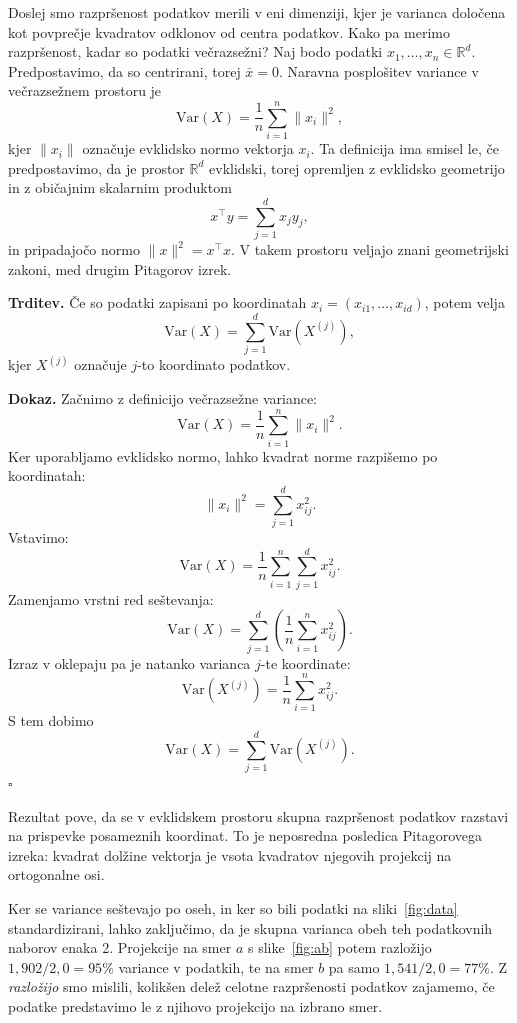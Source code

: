 Doslej smo razpršenost podatkov merili v eni dimenziji, kjer je varianca določena kot povprečje kvadratov odklonov od centra podatkov. Kako pa merimo razpršenost, kadar so podatki večrazsežni? Naj bodo podatki $x_1, \dots, x_n \in \mathbb{R}^d$. Predpostavimo, da so centrirani, torej $\bar{x} = 0$. Naravna posplošitev variance v večrazsežnem prostoru je
\[
\mathrm{Var}(X) = \frac{1}{n} \sum_{i=1}^n \|x_i\|^2,
\]
kjer $\|x_i\|$ označuje evklidsko normo vektorja $x_i$. Ta definicija ima smisel le, če predpostavimo, da je prostor $\mathbb{R}^d$ evklidski, torej opremljen z evklidsko geometrijo in z običajnim skalarnim produktom
\[
x^\top y = \sum_{j=1}^d x_j y_j,
\]
in pripadajočo normo $\|x\|^2 = x^\top x$. V takem prostoru veljajo znani geometrijski zakoni, med drugim Pitagorov izrek.

\medskip

\textbf{Trditev.} Če so podatki zapisani po koordinatah $x_i = (x_{i1}, \dots, x_{id})$, potem velja
\[
\mathrm{Var}(X) = \sum_{j=1}^d \mathrm{Var}(X^{(j)}),
\]
kjer $X^{(j)}$ označuje $j$-to koordinato podatkov.

\medskip

\textbf{Dokaz.} Začnimo z definicijo večrazsežne variance:
\[
\mathrm{Var}(X) = \frac{1}{n} \sum_{i=1}^n \|x_i\|^2.
\]
Ker uporabljamo evklidsko normo, lahko kvadrat norme razpišemo po koordinatah:
\[
\|x_i\|^2 = \sum_{j=1}^d x_{ij}^2.
\]
Vstavimo:
\[
\mathrm{Var}(X) = \frac{1}{n} \sum_{i=1}^n \sum_{j=1}^d x_{ij}^2.
\]
Zamenjamo vrstni red seštevanja:
\[
\mathrm{Var}(X) = \sum_{j=1}^d \left( \frac{1}{n} \sum_{i=1}^n x_{ij}^2 \right).
\]
Izraz v oklepaju pa je natanko varianca $j$-te koordinate:
\[
\mathrm{Var}(X^{(j)}) = \frac{1}{n} \sum_{i=1}^n x_{ij}^2.
\]
S tem dobimo
\[
\mathrm{Var}(X) = \sum_{j=1}^d \mathrm{Var}(X^{(j)}).
\]
\hfill $\square$

\medskip

Rezultat pove, da se v evklidskem prostoru skupna razpršenost podatkov razstavi na prispevke posameznih koordinat. To je neposredna posledica Pitagorovega izreka: kvadrat dolžine vektorja je vsota kvadratov njegovih projekcij na ortogonalne osi.

Ker se variance
%
%
seštevajo po oseh, in ker so bili podatki na sliki~\ref{fig:data} standardizirani, lahko zaključimo, da je skupna varianca obeh teh podatkovnih naborov enaka 2. Projekcije na smer $a$ s slike~\ref{fig:ab} potem razložijo $1,902/2,0=95\%$ variance v podatkih, te na smer $b$ pa samo $1,541/2,0=77\%$. Z {\em razložijo} smo mislili, kolikšen delež celotne razpršenosti podatkov zajamemo, če podatke predstavimo le z njihovo projekcijo na izbrano smer. 

